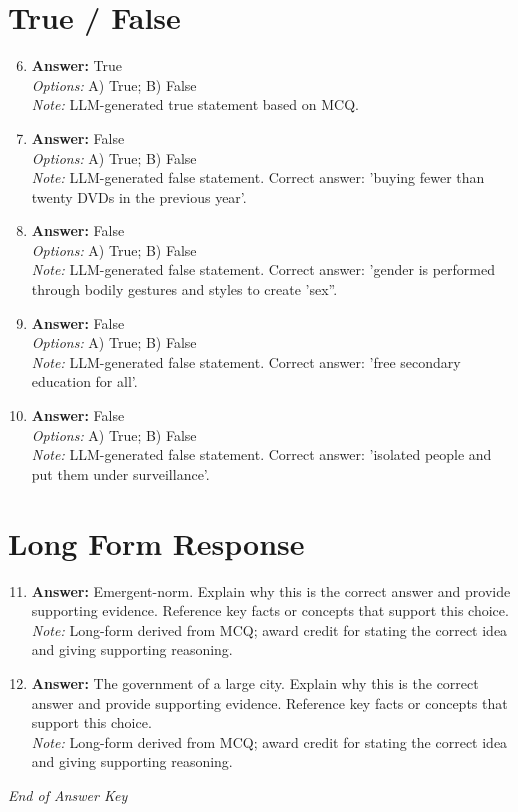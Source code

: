 \documentclass[12pt]{article}
\begin{document}
\section*{True / False}
\begin{enumerate}[label=\arabic*.]
\setcounter{enumi}{5}
\item \textbf{Answer:} True
\\ \textit{Options:} A) True; B) False
\\ \textit{Note:} LLM-generated true statement based on MCQ.
\item \textbf{Answer:} False
\\ \textit{Options:} A) True; B) False
\\ \textit{Note:} LLM-generated false statement. Correct answer: 'buying fewer than twenty DVDs in the previous year'.
\item \textbf{Answer:} False
\\ \textit{Options:} A) True; B) False
\\ \textit{Note:} LLM-generated false statement. Correct answer: 'gender is performed through bodily gestures and styles to create 'sex''.
\item \textbf{Answer:} False
\\ \textit{Options:} A) True; B) False
\\ \textit{Note:} LLM-generated false statement. Correct answer: 'free secondary education for all'.
\item \textbf{Answer:} False
\\ \textit{Options:} A) True; B) False
\\ \textit{Note:} LLM-generated false statement. Correct answer: 'isolated people and put them under surveillance'.
\end{enumerate}

\section*{Long Form Response}
\begin{enumerate}[label=\arabic*.]
\setcounter{enumi}{10}
\item \textbf{Answer:} Emergent-norm. Explain why this is the correct answer and provide supporting evidence. Reference key facts or concepts that support this choice.
\\ \textit{Note:} Long-form derived from MCQ; award credit for stating the correct idea and giving supporting reasoning.
\item \textbf{Answer:} The government of a large city. Explain why this is the correct answer and provide supporting evidence. Reference key facts or concepts that support this choice.
\\ \textit{Note:} Long-form derived from MCQ; award credit for stating the correct idea and giving supporting reasoning.
\end{enumerate}

\vfill
\noindent\textit{End of Answer Key}
\end{document}
